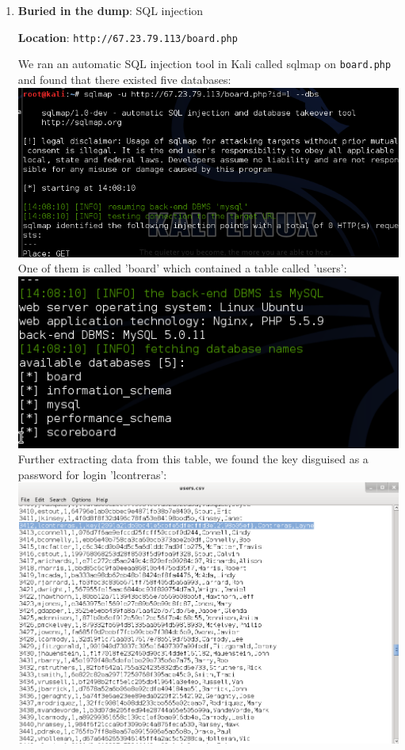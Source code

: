 \documentclass[12pt]{article}
\begin{document}
\begin{enumerate}[1.]
\item \textbf{Buried in the dump}: SQL injection

\textbf{Location}: \texttt{http://67.23.79.113/board.php}

We ran an automatic SQL injection tool in Kali called sqlmap on \texttt{board.php} and found that there existed five databases: \\

\includegraphics[scale=0.5]{images/flag8a} \\

One of them is called 'board' which contained a table called 'users': \\

\includegraphics[scale=0.5]{images/flag8b} \\

Further extracting data from this table, we found the key disguised as a password for login 'lcontreras': \\

\includegraphics[scale=0.35]{images/flag8c} \\


\end{enumerate}
\end{document}
